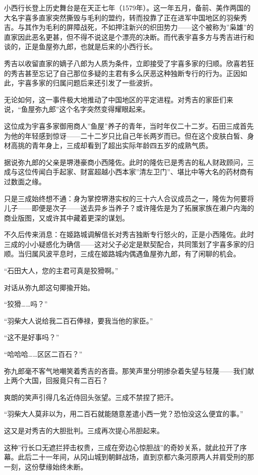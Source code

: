 \documentclass[
]{article}
\begin{document}
小西行长登上历史舞台是在天正七年（1579年）。这一年五月，备前、美作两国的大名宇喜多直家突然撕毁与毛利的盟约，转而投靠了正在进军中国地区的羽柴秀吉。与其作为毛利的屏障战死，不如押注新兴的织田势力------这个被称为''枭雄''的直家因此恶名更甚，但不得不说这是个漂亮的决断。而代表宇喜多方与秀吉进行和谈的，正是鱼屋弥九郎，也就是后来的小西行长。

秀吉以收留直家的嫡子八郎为人质为条件，立即接受了宇喜多家的归顺。欣喜若狂的秀吉甚至忘记了自己那位多疑的主君有多么厌恶这种独断专行的行为。正因如此，宇喜多家的归属问题后来还引发了一些波折。

无论如何，这一事件极大地推动了中国地区的平定进程。对秀吉的家臣们来说，``鱼屋弥九郎''这个名字突然变得耀眼起来。

这位成为宇喜多家御用商人''鱼屋''养子的青年，当时年仅二十二岁。石田三成首先为他的年轻感到惊讶------二十二岁只比自己年长两岁而已。但在这个皮肤白皙、身材高挑的青年身上，三成却看到了超出实际年龄四五岁的成熟气质。

据说弥九郎的父亲是堺港豪商小西隆佐。此时的隆佐已是秀吉的私人财政顾问，三成与这位传闻白手起家、财富超越小西本家''清左卫门''、堪比中等大名的药材商有过数面之缘。

只是三成始终想不通：身为掌控堺港实权的三十六人合议成员之一，隆佐为何要将儿子------即便是次子------送去异乡当养子？或许隆佐是为了拓展家族在濑户内海的商业版图，又或许其中藏着更深的谋划。

不久后传来消息：在姬路城调解信长对秀吉独断专行怒火的，正是小西隆佐。此时三成的小小疑惑化为确信------这对父子必定是默契配合，共同策划了宇喜多家的归顺。当归属风波平息时，三成在姬路城内偶遇鱼屋弥九郎，有了闲聊的机会。

``石田大人，您的主君可真是狡猾啊。''

对话从弥九郎这句揶揄开始。

``狡猾\ldots\ldots 吗？''

``羽柴大人说给我二百石俸禄，要我当他的家臣。''

``这不是好事吗？''

``哈哈哈\ldots\ldots 区区二百石？''

弥九郎毫不客气地嘲笑着秀吉的吝啬。那笑声里分明掺杂着失望与轻蔑------我们献上两个大国，回报竟只有二百石？

爽朗的笑声引得几名近侍回头张望。三成不禁捏了把汗。

``羽柴大人莫非以为，用二百石就能随意差遣小西一党？恐怕没这么便宜的事。''

这又是对秀吉的大胆批判。三成再次提心吊胆起来。

这种''行长口无遮拦抨击权贵，三成在旁边心惊胆战''的奇妙关系，就此拉开了序幕。此后二十一年间，从冈山城到朝鲜战场，直到京都六条河原两人并肩受刑的那一刻，这份孽缘始终未断。
\end{document}
